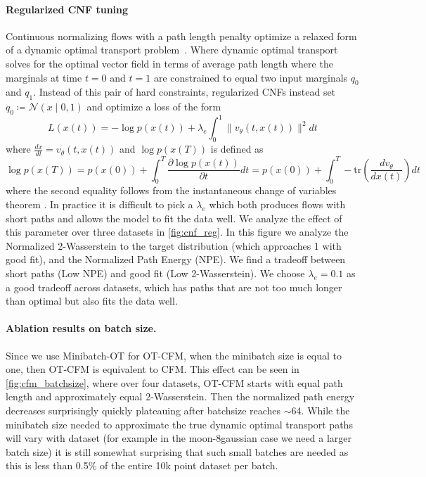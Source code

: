 \documentclass[10pt]{article}
\theoremstyle{plain}
\theoremstyle{definition}
\theoremstyle{remark}
\begin{document}
\paragraph{Regularized CNF tuning} Continuous normalizing flows with a path length penalty optimize a relaxed form of a dynamic optimal transport problem~\citep{tong_trajectorynet_2020,finlay_how_2020,onken_ot-flow_2021}. Where dynamic optimal transport solves for the optimal vector field in terms of average path length where the marginals at time $t=0$ and $t=1$ are constrained to equal two input marginals $q_0$ and $q_1$. Instead of this pair of hard constraints, regularized CNFs instead set $q_0 \coloneqq \mathcal{N}( x \mid 0, 1)$ and optimize a loss of the form
\begin{equation}
L(x(t)) = -\log p(x(t)) + \lambda_e \int_0^1 \|v_\theta(t, x(t))\|^2 dt
\end{equation}
where $\frac{dx}{dt} = v_\theta(t, x(t))$ and $\log p(x(T))$ is defined as 
\begin{equation}
\log p(x(T)) = p(x(0)) + \int_0^T \frac{\partial \log p(x(t))}{\partial t} dt = p(x(0)) + \int_0^T -\mathrm{tr}\left ( \frac{ d v_\theta}{d x(t)} \right ) dt 
\end{equation}
where the second equality follows from the instantaneous change of variables theorem \citep[Theorem 1]{chen_neural_2018}. In practice it is difficult to pick a $\lambda_e$ which both produces flows with short paths and allows the model to fit the data well. We analyze the effect of this parameter over three datasets in \autoref{fig:cnf_reg}. In this figure we analyze the Normalized 2-Wasserstein to the target distribution (which approaches 1 with good fit), and the Normalized Path Energy (NPE). We find a tradeoff between short paths (Low NPE) and good fit (Low 2-Wasserstein). We choose $\lambda_e = 0.1$ as a good tradeoff across datasets, which has paths that are not too much longer than optimal but also fits the data well. 

\paragraph{Ablation results on batch size.} Since we use Minibatch-OT for OT-CFM, when the minibatch size is equal to one, then OT-CFM is equivalent to CFM. This effect can be seen in \autoref{fig:cfm_batchsize}, where over four datasets, OT-CFM starts with equal path length and approximately equal 2-Wasserstein. Then the normalized path energy decreases surprisingly quickly plateauing after batchsize reaches $\sim$64. While the minibatch size needed to approximate the true dynamic optimal transport paths will vary with dataset (for example in the moon-8gaussian case we need a larger batch size) it is still somewhat surprising that such small batches are needed as this is less than 0.5\% of the entire 10k point dataset per batch.
\end{document}
